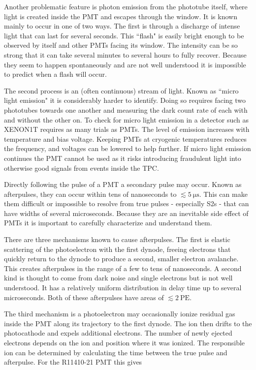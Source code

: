 Another problematic feature is photon emission from the phototube itself, where light is created inside the PMT and escapes through the
window.  It is known mainly to occur in one of two ways.  The first is through a discharge of intense light that can last for
several seconds.  This ``flash" is easily bright enough to be observed by itself and other PMTs facing its
window.  The intensity can be so strong that it can take several minutes to several hours to fully
recover.  Because they seem to happen spontaneously and are not well understood it is impossible to predict when a flash will occur.

The second process is an (often continuous) stream of light.  Known as ``micro light emission" it is considerably harder to
identify.  Doing so requires facing two phototubes towards one another and measuring the dark count rate of each with and without the
other on.  To check for micro light emission in a detector such as XENON1T requires as many trials as PMTs.  The level of emission
increases with temperature and bias voltage.  Keeping PMTs at cryogenic temperatures reduces
the frequency, and voltages can be lowered to help further.  If micro light emission continues the PMT cannot be used as it risks
introducing fraudulent light into otherwise good signals from events inside the TPC.

Directly following the pulse of a PMT a secondary pulse may occur.  Known as afterpulses, they can occur within tens of nanoseconds to
$\lesssim 5\ \mathrm{\mu s}$.  This can make them difficult or impossible to resolve from true pulses - especially S2s - that can have
widths of several
microseconds.  Because they are an inevitable side effect of PMTs it is important to carefully characterize and understand them.

There are three mechanisms known to cause afterpulses.  The first is elastic scattering of the photoelectron with the first dynode,
freeing electrons that quickly return to the dynode to produce a second, smaller electron avalanche.  This
creates afterpulses in the range of a few to tens of nanoseconds.  A second kind is thought to come
from dark noise and single electrons but is not well understood.  It has a relatively uniform distribution in delay time up to several
microseconds.  Both of these afterpulses have areas of $\lesssim 2\ \mathrm{PE}$.

The third mechanism is a photoelectron may occasionally ionize residual gas inside the PMT along its trajectory to the first dynode.  The
ion then drifts to the photocathode and expels additional electrons.  The number of newly ejected electrons depends
on the ion and position where it was ionized.  The responsible ion can be determined by calculating the time between the true pulse and
afterpulse.  For the R11410-21 PMT this gives

